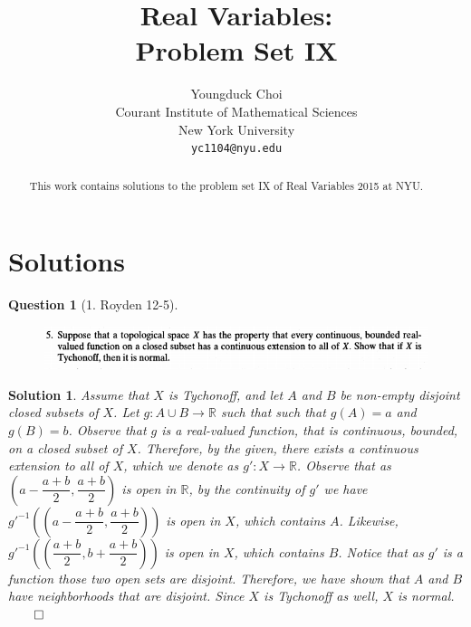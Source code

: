 \documentclass{article} %
\title{Real Variables: \\
Problem Set IX}
\author{
Youngduck Choi \\
Courant Institute of Mathematical Sciences \\
New York University \\
\texttt{yc1104@nyu.edu} \\
}
\theoremstyle{quest}
\newtheorem*{question}{Question}
\newtheorem*{solution}{Solution}
\begin{document}
\maketitle

\begin{abstract}
This work contains solutions to the problem set 
IX of Real Variables 2015 at NYU.
\end{abstract}

\section{Solutions}

\begin{question}[1. Royden 12-5]
\hfill
\begin{figure}[h!]
  \centering
    \includegraphics[width=1\textwidth]{12-5.png}
\end{figure}
\end{question}
\begin{solution}
Assume that $X$ is Tychonoff, and let $A$ and $B$ 
be non-empty disjoint closed subsets of 
$X$. Let $g:A \cup B \to \mathbb{R}$ such that  
such that $g(A) = a$ and $g(B) = b$. Observe that $g$ is a real-valued
function, that is continuous, bounded, on a closed subset of $X$. 
Therefore, by the given, there exists a continuous extension to 
all of $X$, which we denote as $g':X \to \mathbb{R}$. Observe that
as $(a-\dfrac{a+b}{2},\dfrac{a+b}{2})$ is open in $\mathbb{R}$, 
by the continuity of $g'$
we have $g'^{-1}((a-\dfrac{a+b}{2},\dfrac{a+b}{2}))$ is open in $X$, 
which contains 
$A$. Likewise, $g'^{-1}((\dfrac{a+b}{2},b+\dfrac{a+b}{2}))$ 
is open in $X$, which contains
$B$. Notice that as $g'$ is a function those two open sets are disjoint.
Therefore, we have shown that $A$ and $B$ have neighborhoods that are 
disjoint. Since $X$ is Tychonoff as well, $X$ is normal. 
\hfill $\qed$
\end{solution}

\bigskip
\end{document}
